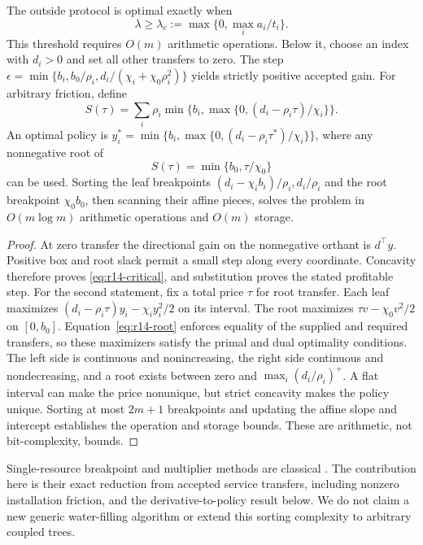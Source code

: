 \begin{proposition}\label{prop:r14-price}
The outside protocol is optimal exactly when
\begin{equation}\label{eq:r14-critical}
 \lambda\geq\lambda_c:=\max\{0,\max_i a_i/t_i\}.
\end{equation}
This threshold requires $O(m)$ arithmetic operations. Below it, choose an index with $d_i>0$ and set all other transfers to zero. The step
$\epsilon=\min\{b_i,b_0/\rho_i,d_i/(\chi_i+\chi_0\rho_i^2)\}$ yields strictly positive accepted gain.
For arbitrary friction, define
\[
 S(\tau)=\sum_i\rho_i\min\{b_i,\max\{0,(d_i-\rho_i\tau)/\chi_i\}\}.
\]
An optimal policy is $y_i^*=\min\{b_i,\max\{0,(d_i-\rho_i\tau^*)/\chi_i\}\}$, where any nonnegative root of
\begin{equation}\label{eq:r14-root}
 S(\tau)=\min\{b_0,\tau/\chi_0\}
\end{equation}
can be used. Sorting the leaf breakpoints $(d_i-\chi_ib_i)/\rho_i,d_i/\rho_i$ and the root breakpoint $\chi_0b_0$, then scanning their affine pieces, solves the problem in $O(m\log m)$ arithmetic operations and $O(m)$ storage.
\end{proposition}
\begin{proof}
At zero transfer the directional gain on the nonnegative orthant is $d^\top y$. Positive box and root slack permit a small step along every coordinate. Concavity therefore proves \eqref{eq:r14-critical}, and substitution proves the stated profitable step. For the second statement, fix a total price $\tau$ for root transfer. Each leaf maximizes $(d_i-\rho_i\tau)y_i-\chi_iy_i^2/2$ on its interval. The root maximizes $\tau v-\chi_0v^2/2$ on $[0,b_0]$. Equation~\eqref{eq:r14-root} enforces equality of the supplied and required transfers, so these maximizers satisfy the primal and dual optimality conditions. The left side is continuous and nonincreasing, the right side continuous and nondecreasing, and a root exists between zero and $\max_i(d_i/\rho_i)^+$. A flat interval can make the price nonunique, but strict concavity makes the policy unique. Sorting at most $2m+1$ breakpoints and updating the affine slope and intercept establishes the operation and storage bounds. These are arithmetic, not bit-complexity, bounds.
\end{proof}

Single-resource breakpoint and multiplier methods are classical \citep{PatrikssonStromberg2015}. The contribution here is their exact reduction from accepted service transfers, including nonzero installation friction, and the derivative-to-policy result below. We do not claim a new generic water-filling algorithm or extend this sorting complexity to arbitrary coupled trees.

